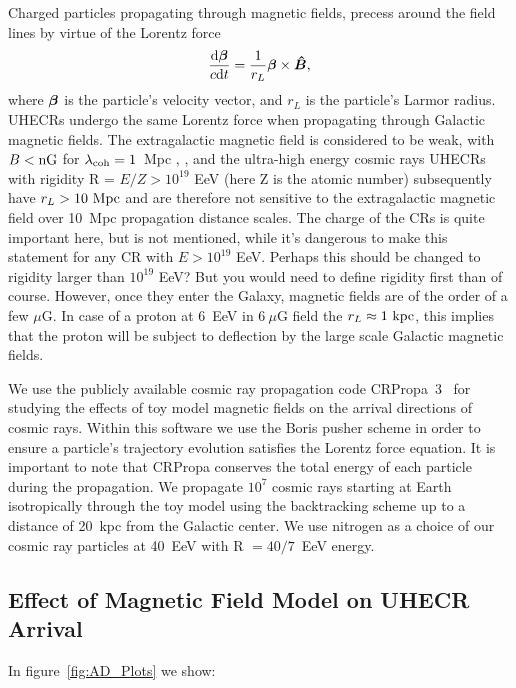 \documentclass[usenatbib]{mnras}
\newcommand{\Arjen}[1]{{\color{brown}#1}}
\newcommand{\bfm}[1]{\mbox{\boldmath$ #1 $}}
\begin{document}
Charged particles propagating through magnetic fields, precess around the field lines by virtue of the Lorentz force 
\begin{eqnarray}
\frac{{\rm d}\bfm{\beta}}{c{\rm d}t} = \frac{1}{r_{L}}\bfm{\beta}\times \bfm{\hat{B}}, 
\end{eqnarray}
where $\bfm{\beta}$ is the particle's velocity vector, and $r_{L}$ is the particle's Larmor radius. UHECRs undergo the same Lorentz force when propagating through Galactic magnetic fields. The extragalactic magnetic field is considered to be weak, with $B < \rm {nG}$ for $\lambda_{\rm coh}=1$~Mpc \cite{Blasi_1999}, \cite{Kronberg_2007}, and the ultra-high energy cosmic rays UHECRs with rigidity R = $E/Z > 10^{19}$ EeV (here Z is the atomic number) subsequently have $r_{L}>{\rm 10~Mpc}$ and are therefore not sensitive to the extragalactic magnetic field over 10~Mpc propagation distance scales. \Arjen{The charge of the CRs is quite important here, but is not mentioned, while it's dangerous to make this statement for any CR with $E > 10^{19}$ EeV. Perhaps this should be changed to rigidity larger than $10^{19}$ EeV? But you would need to define rigidity first than of course.}
However, once they enter the Galaxy, magnetic fields are of the order of a few $\mu$G. In case of a proton at 6~EeV in $6~\mu$G field the $r_L \approx 1 ~ \rm kpc$, this implies that the proton will be subject to deflection by the large scale Galactic magnetic fields.

We use the publicly available cosmic ray propagation code CRPropa~3~\cite{CRPropa3_2016} for studying the effects of toy model magnetic fields on the arrival directions of cosmic rays. Within this software we use the Boris pusher scheme in order to ensure a particle's trajectory evolution satisfies the Lorentz force equation. It is important to note that CRPropa conserves the total energy of each particle during the propagation.
We propagate $10^7$ cosmic rays starting at Earth isotropically through the toy model using the backtracking scheme up to a distance of 20~kpc from the Galactic center. We use nitrogen as a choice of our cosmic ray particles at 40~EeV with R $= 40/7$~EeV energy. 

\subsection{Effect of Magnetic Field Model on UHECR Arrival}

In figure~\ref{fig:AD_Plots} we show:
\end{document}
